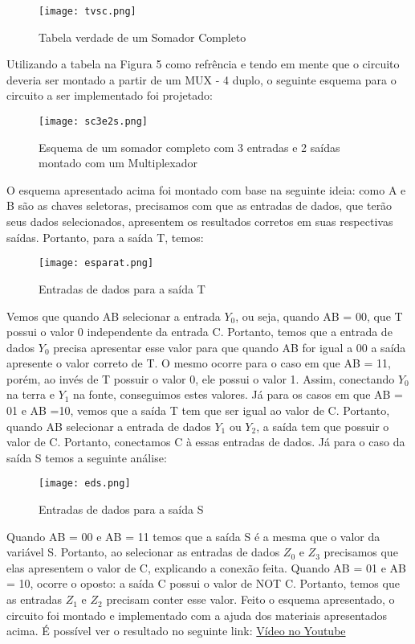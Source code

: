 \documentclass[12pt]{article}
\begin{document}
\begin{figure}[H]
\centering
\texttt{[image: tvsc.png]}
\caption{Tabela verdade de um Somador Completo}
\label{fig:tvsc}
\end{figure}

Utilizando a tabela na Figura 5 como refrência e tendo em mente que o circuito deveria ser montado a partir de um MUX - 4 duplo, o seguinte esquema para o circuito a ser implementado foi projetado:

\begin{figure}[H]
	\centering
	\texttt{[image: sc3e2s.png]}
	\caption{Esquema de um somador completo com 3 entradas e 2 saídas montado com um Multiplexador}
	\label{fig:3e2s}
\end{figure}

O esquema apresentado acima foi montado com base na seguinte ideia: como A e B são as chaves seletoras, precisamos com que as entradas de dados, que terão seus dados selecionados, apresentem os resultados corretos em suas respectivas saídas. Portanto, para a saída T, temos:

\begin{figure}[H]
	\centering
	\texttt{[image: esparat.png]}
	\caption{Entradas de dados para a saída T}
	\label{fig:est}
\end{figure}

Vemos que quando AB selecionar a entrada $Y_{0}$, ou seja, quando AB = 00, que T possui o valor 0 independente da entrada C. Portanto, temos que a entrada de dados $Y_{0}$ precisa apresentar esse valor para que quando AB for igual a 00 a saída apresente o valor correto de T. O mesmo ocorre para o caso em que AB = 11, porém, ao invés de T possuir o valor 0, ele possui o valor 1. Assim, conectando $Y_{0}$ na terra e $Y_{1}$ na fonte, conseguimos estes valores. Já para os casos em que AB = 01 e AB =10, vemos que a saída T tem que ser igual ao valor de C. Portanto, quando AB selecionar a entrada de dados $Y_{1}$ ou $Y_{2}$, a saída tem que possuir o valor de C. Portanto, conectamos C à essas entradas de dados.
Já para o caso da saída S temos a seguinte análise:

\begin{figure}[H]
	\centering
	\texttt{[image: eds.png]}
	\caption{Entradas de dados para a saída S}
	\label{fig:eds}
\end{figure}

Quando AB = 00 e AB = 11 temos que a saída S é a mesma que o valor da variável S. Portanto, ao selecionar as entradas de dados $Z_{0}$ e $Z_{3}$ precisamos que elas apresentem o valor de C, explicando a conexão feita. Quando AB = 01 e AB = 10, ocorre o oposto: a saída C possui o valor de NOT C. Portanto, temos que as entradas $Z_{1}$ e $Z_{2}$ precisam conter esse valor. 
Feito o esquema apresentado, o circuito foi montado e implementado com a ajuda dos materiais apresentados acima.
É possível ver o resultado no seguinte link: \href{https://youtu.be/T1X_-Ha7S-g}{Vídeo no Youtube}
\end{document}
